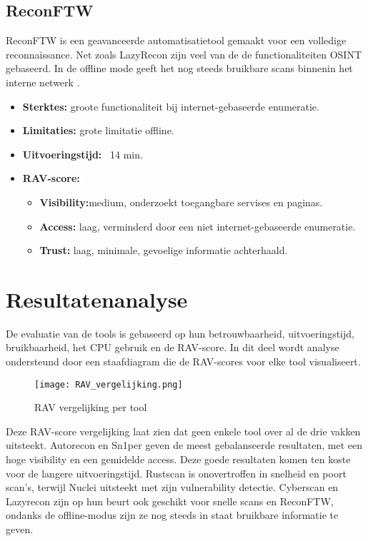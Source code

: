 \subsection{ReconFTW}

ReconFTW is een geavanceerde automatisatietool gemaakt voor een volledige reconnaissance. Net zoals LazyRecon zijn veel van de de functionaliteiten OSINT gebaseerd. 
In de offline mode geeft het nog steeds bruikbare scans binnenin het interne netwerk \autocite{reconftw}.

\begin{itemize}
  \item \textbf{Sterktes:} groote functionaliteit bij internet-gebaseerde enumeratie.
  \item \textbf{Limitaties:} grote limitatie offline.
  \item \textbf{Uitvoeringstijd:} ~14 min.
  \item \textbf{RAV-score:} 
    \small{
    \begin{itemize}
      \item \textbf{Visibility:}medium, onderzoekt toegangbare servises en paginas.
      \item \textbf{Access:} laag, verminderd door een niet internet-gebaseerde enumeratie.
      \item \textbf{Trust:} laag, minimale, gevoelige informatie achterhaald. 
    \end{itemize}
    }
\end{itemize}

\section{Resultatenanalyse}

De evaluatie van de tools is gebaseerd op hun betrouwbaarheid, uitvoeringstijd, bruikbaarheid, het CPU gebruik en de RAV-score. 
In dit deel wordt analyse ondersteund door een staafdiagram die de RAV-scores voor elke tool visualiseert.  

\begin{figure}[H] 
\centering
\texttt{[image: RAV\_vergelijking.png]}
\caption{RAV vergelijking per tool}
\label{fig:rav_barplot}
\end{figure}

Deze RAV-score vergelijking laat zien dat geen enkele tool over al de drie vakken uitsteekt. 
Autorecon en Sn1per geven de meest gebalanseerde resultaten, met een hoge visibility en een gemidelde access. Deze goede resultaten komen ten koste voor de langere uitvoeringstijd.
Rustscan is onovertroffen in snelheid en poort scan's, terwijl Nuclei uitsteekt met zijn vulnerability detectie.
Cyberscan en Lazyrecon zijn op hun beurt ook geschikt voor snelle scans en ReconFTW, ondanks de offline-modus zijn ze nog steeds in staat bruikbare informatie te geven. 

